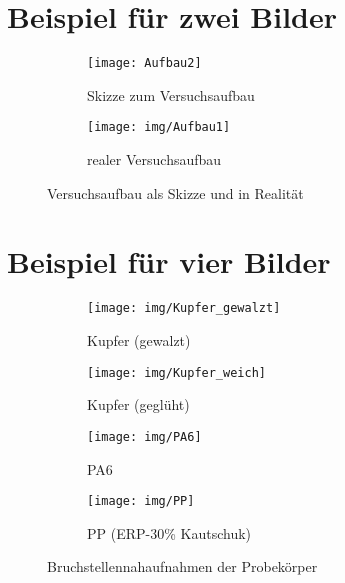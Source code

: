 \newpage

\section{Beispiel für zwei Bilder}
\label{sec:versuchsaufbau}

\begin{figure}[h!]
	\centering
	\begin{subfigure}{.5\textwidth}
		\centering
		\texttt{[image: Aufbau2]}
		\caption{Skizze zum Versuchsaufbau}
		\label{fig:sub1}
	\end{subfigure}%
	\begin{subfigure}{.5\textwidth}
		\centering
		\texttt{[image: img/Aufbau1]}
		\caption{realer Versuchsaufbau}
		\label{fig:sub2}
	\end{subfigure}
	\caption{Versuchsaufbau als Skizze und in Realität}
	\label{fig:aufbau} 
\end{figure}
\FloatBarrier

\newpage


\section{Beispiel für vier Bilder}
\begin{figure}[h!]
	\centering
	\begin{subfigure}{.5\textwidth}
		\centering
		\texttt{[image: img/Kupfer\_gewalzt]}
		\caption{Kupfer (gewalzt)}
		\label{fig:sub3}
	\end{subfigure}%
	\begin{subfigure}{.5\textwidth}
		\centering
		\texttt{[image: img/Kupfer\_weich]}
		\caption{Kupfer (geglüht)}
		\label{fig:sub4}
	\end{subfigure}
	\begin{subfigure}{.5\textwidth}
		\centering
		\texttt{[image: img/PA6]}
		\caption{PA6}
		\label{fig:sub5}
	\end{subfigure}%
	\begin{subfigure}{.5\textwidth}
		\centering
		\texttt{[image: img/PP]}
		\caption{PP (ERP-30\% Kautschuk)}
		\label{fig:sub6}
	\end{subfigure}
	
	\caption{Bruchstellennahaufnahmen der Probekörper}
	\label{fig:bruchstellen} 
\end{figure}
\FloatBarrier

